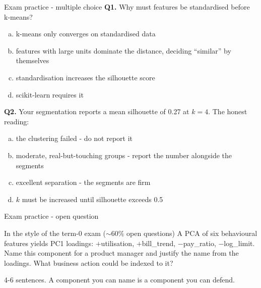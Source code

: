 \documentclass[10pt,aspectratio=169]{beamer}
\begin{document}
\begin{frame}{Exam practice - multiple choice}
  \small
  \textbf{Q1.} Why must features be standardised before k-means?
  \begin{enumerate}[(a)]
    \item k-means only converges on standardised data
    \item features with large units dominate the distance, deciding
          ``similar'' by themselves
    \item standardisation increases the silhouette score
    \item scikit-learn requires it
  \end{enumerate}
  \vspace{0.4em}
  \textbf{Q2.} Your segmentation reports a mean silhouette of 0.27 at $k=4$.
  The honest reading:
  \begin{enumerate}[(a)]
    \item the clustering failed - do not report it
    \item moderate, real-but-touching groups - report the number alongside
          the segments
    \item excellent separation - the segments are firm
    \item $k$ must be increased until silhouette exceeds 0.5
  \end{enumerate}
\end{frame}

\begin{frame}{Exam practice - open question}
  \begin{block}{In the style of the term-0 exam ($\sim$60\% open questions)}
    A PCA of six behavioural features yields PC1 loadings:
    $+$utilisation, $+$bill\_trend, $-$pay\_ratio, $-$log\_limit.
    Name this component for a product manager and justify the name from the
    loadings. What business action could be indexed to it?
  \end{block}
  \vspace{0.5em}
  \begin{center}\small
    4-6 sentences. A component you can name is a component you can defend.
  \end{center}
\end{frame}
\end{document}
